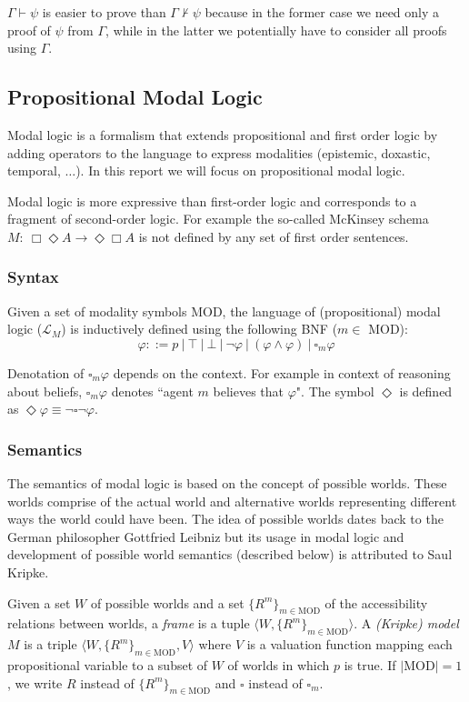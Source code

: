 \documentclass{article}
\begin{document}
$\Gamma\vdash\psi$ is easier to prove than $\Gamma\nvdash\psi$ because in the former case we need only a proof of $\psi$ from $\Gamma$, while in the latter we potentially have to consider all proofs using $\Gamma$.

\subsection{Propositional Modal Logic}
Modal logic is a formalism that extends propositional and first order logic by adding operators to the language to express modalities (epistemic, doxastic, temporal, $\ldots$).  In this report we will focus on propositional modal logic.

Modal logic is more expressive than first-order logic and corresponds to a fragment of second-order logic. For example the so-called McKinsey schema $M:\ \Box\Diamond A\rightarrow \Diamond\Box A$ 
is not defined by any set of first order sentences.

\subsubsection{Syntax}
Given a set of modality symbols MOD, the language of (propositional) modal logic ($\mathcal{L}_{M}$) is inductively defined using the following BNF ($m\in $ MOD)\cite{BlackburnEtAl07}:
\[\varphi ::= p \  |\ \top \ |\ \bot \ |\ \neg \varphi \ |\  (\varphi\land \varphi)\ |\ \square_m\varphi\]

Denotation of $\square_m\varphi$ depends on the context. For example in context of reasoning about beliefs, $\square_m\varphi$ denotes ``agent $m$ believes that $\varphi$".
The symbol $\Diamond$ is defined as $\Diamond \varphi \equiv \neg \square \neg \varphi$.

\subsubsection{Semantics}
The semantics of modal logic is based on the concept of possible worlds. These worlds comprise of the actual world and alternative worlds representing different ways the world could have been. The idea of possible worlds dates back to the German philosopher Gottfried Leibniz but its usage in modal logic and development of possible world semantics (described below) is attributed to Saul Kripke.

Given a set $W$ of possible worlds and a set $\{R^m\}_{m\in \text{MOD}}$ of the accessibility relations between worlds, a \emph{frame} is a tuple $\langle W, \{R^m\}_{m\in \text{MOD}}\rangle$. A \emph{(Kripke) model} $M$ is a triple \mbox{$\langle W, \{R^m\}_{m\in \text{MOD}}, V\rangle$} where $V$ is a valuation function mapping each propositional variable to a subset of $W$ of worlds in which $p$ is true. If $|$MOD$|=1$, we  write $R$ instead of $\{R^m\}_{m\in \text{MOD}}$ and $\square$ instead of $\square_m$. \cite{BlackburnEtAl07}\\
\end{document}

